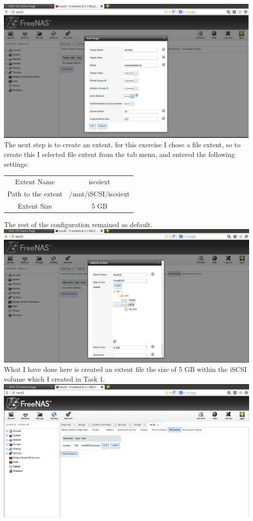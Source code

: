\\\includegraphics[width=\textwidth]{6.png}
The next step is to create an extent, for this exercise I chose a file extent, so to create this I selected file extent from the tab menu, and entered the following settings:
\begin{center}
\begin{tabular}{ |c|c| } 
 \hline
 Extent Name & iscsiext \\ 
 Path to the extent & /mnt/iSCSI/iscsiext\\ 
 Extent Size & 5 GB \\ 
 \hline
\end{tabular}
\end{center}
The rest of the configuration remained as default.
\\\includegraphics[width=\textwidth]{9.png}
What I have done here is created an extent file the size of 5 GB within the iSCSI volume which I created in Task 1.
\\\includegraphics[width=\textwidth]{10.png}
